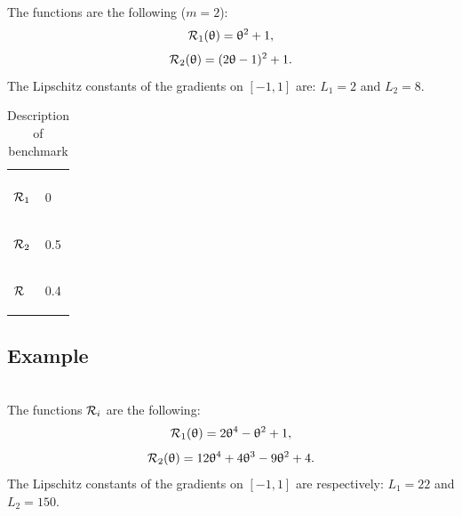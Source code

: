 \documentclass[article,authoryear,jmlmc]{beg_32}             %
\begin{document}
The functions are the following ($m=2$):
\begin{equation*}
	\mathcal{R}_1(\uptheta) = \uptheta^2+1,
\end{equation*}
\begin{equation*}
	\mathcal{R}_2(\uptheta) = (2\uptheta-1)^2+1.
\end{equation*}
The Lipschitz constants of the gradients on $[-1,1]$ are: $L_1=2$ and $L_2=8$.

\begin{table}[h!]
	\centering
	\caption{Description of benchmark \exOne}
	\begin{tabular}{ll}
		
		\begin{bf} \diagbox{Functions}{Minima} \end{bf} & \begin{bf}\mg\end{bf} \\ 
		
		\begin{bf}$\mathcal{R}_1$\end{bf} &  0   \\ 
		\begin{bf}$\mathcal{R}_2$\end{bf} &  0.5 \\ 
		\begin{bf}$\mathcal{R}$\end{bf}   &  0.4 \\ 
	\end{tabular}
	\label{ex1_example}
\end{table}

\subsection{Example \exTwo}
~~\\
The functions $\mathcal{R}_i$ are the following:
\begin{equation*}
	\mathcal{R}_1(\uptheta) = 2\uptheta^4-\uptheta^2+1,
\end{equation*}
\begin{equation*}
	\mathcal{R}_2(\uptheta) = 12\uptheta^4+4\uptheta^3-9\uptheta^2+4.
\end{equation*}
The Lipschitz constants of the gradients on $[-1,1]$ are respectively: $L_1=22$ and $L_2=150$.
\end{document}
